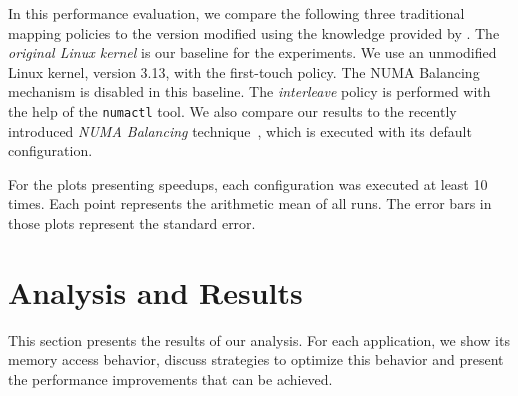 In this performance evaluation, we compare the following three traditional
mapping policies to the version modified using the knowledge provided by \TABARNAC.
The \emph{original Linux kernel} is our baseline for the experiments. We use an unmodified Linux kernel, version 3.13, with the first-touch policy. The NUMA Balancing mechanism is disabled in this baseline.
The \emph{interleave} policy is performed with the help of the \texttt{numactl} tool.
We also compare our results to the recently introduced \emph{NUMA Balancing} technique~\cite{Corbet}, which is executed with its default configuration.

For the plots presenting speedups, each configuration was executed at least 10 times. Each point represents the arithmetic mean of all runs.
The error bars in those plots represent the standard error.


\section{Analysis and Results}
\label{sec:expe-analysis}

This section presents the results of our analysis.
For each application, we show its memory access behavior, discuss strategies to optimize this behavior and present the performance improvements that can be achieved.






